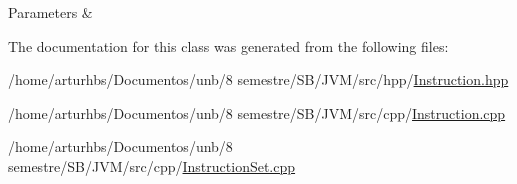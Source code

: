 \begin{DoxyParams}{Parameters}
{\em } & \\
\hline
\end{DoxyParams}


The documentation for this class was generated from the following files\+:\begin{DoxyCompactItemize}
\item 
/home/arturhbs/\+Documentos/unb/8 semestre/\+S\+B/\+J\+V\+M/src/hpp/\hyperlink{Instruction_8hpp}{Instruction.\+hpp}\item 
/home/arturhbs/\+Documentos/unb/8 semestre/\+S\+B/\+J\+V\+M/src/cpp/\hyperlink{Instruction_8cpp}{Instruction.\+cpp}\item 
/home/arturhbs/\+Documentos/unb/8 semestre/\+S\+B/\+J\+V\+M/src/cpp/\hyperlink{InstructionSet_8cpp}{Instruction\+Set.\+cpp}\end{DoxyCompactItemize}
